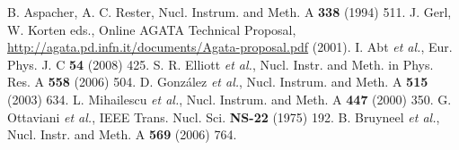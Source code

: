 \begin{thebibliography}{99}
 B. Aspacher, A. C. Rester, Nucl. Instrum. and Meth. A \textbf{338} (1994) 511.
J. Gerl, W. Korten eds., Online AGATA Technical   Proposal, \url{http://agata.pd.infn.it/documents/Agata-proposal.pdf} (2001).
 I. Abt \textit{et al.}, Eur. Phys. J. C \textbf{54}   (2008) 425.
 S. R. Elliott \textit{et al.}, Nucl. Instr. and   Meth. in Phys. Res. A \textbf{558} (2006) 504.
 D. Gonz\'alez \textit{et al.}, Nucl. Instrum. and Meth.  A \textbf{515} (2003) 634.
 L. Mihailescu \textit{et al.}, Nucl. Instrum. and Meth.    A \textbf{447} (2000) 350.
G. Ottaviani \textit{et al.}, IEEE Trans. Nucl. Sci.   \textbf{NS-22} (1975) 192.
 B. Bruyneel \textit{et al.}, Nucl. Instr. and Meth.    A \textbf{569} (2006) 764.

\end{thebibliography}


